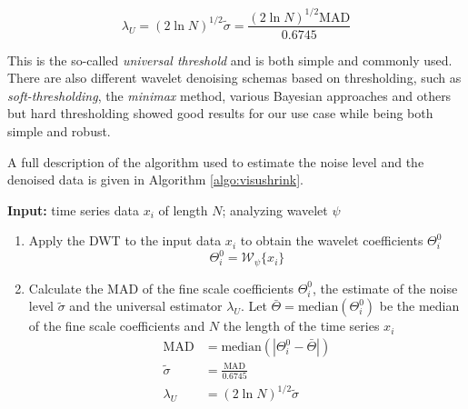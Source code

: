 \begin{equation}
    \lambda_U = (2 \ln N)^{1/2}\tilde{\sigma} = \frac{(2 \ln N)^{1/2}\text{MAD}}{0.6745}
    \label{eq:threshold_esti}
\end{equation}

This is the so-called \textit{universal threshold} and is both simple and commonly used. There are also different wavelet denoising schemas based on thresholding, such 
as \textit{soft-thresholding}, the \textit{minimax} method, various Bayesian approaches and others but hard thresholding showed good results for our use case while being
both simple and robust. 

A full description of the algorithm used to estimate the noise level and the denoised data is given in Algorithm \ref{algo:visushrink}.

\begin{algorithm}[htb]
    \hspace*{\algorithmicindent} \textbf{Input:} time series data $x_i$ of length $N$; analyzing wavelet $\psi$ \\ 
    \begin{enumerate}
        \item Apply the DWT to the input data $x_i$ to obtain the wavelet coefficients $\Theta_i^0$
        \begin{equation}
            \Theta_i^0 = \mathscr{W}_{\psi} \{x_i\}
        \end{equation}

        \item Calculate the MAD of the fine scale coefficients $\Theta_{i}^0$, the estimate of the noise level $\tilde{\sigma}$ and the universal estimator $\lambda_U$. 
        Let $\bar{\Theta} = \text{median}(\Theta_i^0)$ be the median of the fine scale coefficients and $N$ the length of the time series $x_i$
        \begin{align}
        \text{MAD} &= \text{median}(|\Theta_i^0 - \bar{\Theta}|) \\
        \tilde{\sigma} &= \frac{\text{MAD}}{0.6745} \\
        \lambda_U &= (2 \ln N)^{1/2}\tilde{\sigma}
        \end{align}


\end{enumerate}
\end{algorithm}
